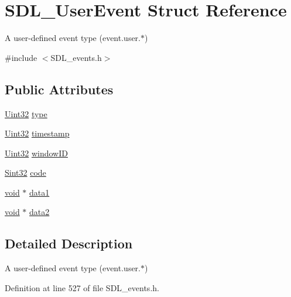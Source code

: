 \hypertarget{struct_s_d_l___user_event}{}\section{S\+D\+L\+\_\+\+User\+Event Struct Reference}
\label{struct_s_d_l___user_event}


A user-\/defined event type (event.\+user.$\ast$)  




{\ttfamily \#include $<$S\+D\+L\+\_\+events.\+h$>$}

\subsection*{Public Attributes}
\begin{DoxyCompactItemize}
\item 
\mbox{\hyperlink{_s_d_l__stdinc_8h_add440eff171ea5f55cb00c4a9ab8672d}{Uint32}} \mbox{\hyperlink{struct_s_d_l___user_event_ab7afa8b98dbd7b52bef41155e10f7340}{type}}
\item 
\mbox{\hyperlink{_s_d_l__stdinc_8h_add440eff171ea5f55cb00c4a9ab8672d}{Uint32}} \mbox{\hyperlink{struct_s_d_l___user_event_adbf1d34c73138a0c549310e5d4ad0c35}{timestamp}}
\item 
\mbox{\hyperlink{_s_d_l__stdinc_8h_add440eff171ea5f55cb00c4a9ab8672d}{Uint32}} \mbox{\hyperlink{struct_s_d_l___user_event_abccefa10e0e0e3a0801bc6d836a08da7}{window\+ID}}
\item 
\mbox{\hyperlink{_s_d_l__stdinc_8h_a7a90b941db9d4582e9ad7abb9940ff7e}{Sint32}} \mbox{\hyperlink{struct_s_d_l___user_event_aef47976781ee82b527a353c5acfa0a34}{code}}
\item 
\mbox{\hyperlink{_s_d_l__opengles2__gl2ext_8h_ae5d8fa23ad07c48bb609509eae494c95}{void}} $\ast$ \mbox{\hyperlink{struct_s_d_l___user_event_ab2893a12be2f97195f16463a23107913}{data1}}
\item 
\mbox{\hyperlink{_s_d_l__opengles2__gl2ext_8h_ae5d8fa23ad07c48bb609509eae494c95}{void}} $\ast$ \mbox{\hyperlink{struct_s_d_l___user_event_aae4dbf65c34d654c9edf519eb061b7cf}{data2}}
\end{DoxyCompactItemize}


\subsection{Detailed Description}
A user-\/defined event type (event.\+user.$\ast$) 

Definition at line 527 of file S\+D\+L\+\_\+events.\+h.



